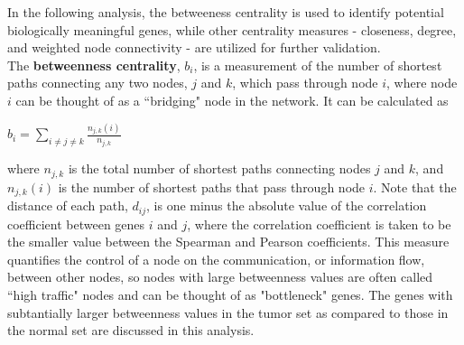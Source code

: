 \documentclass{article}\usepackage[]{graphicx}\usepackage[]{color}
\begin{document}
In the following analysis, the betweeness centrality is used to identify potential biologically meaningful genes, while other centrality measures - closeness, degree, and weighted node connectivity - are utilized for further validation.\\
\newline
The \textbf{betweenness centrality}, $b_i$, is a measurement of the number of shortest paths connecting any two nodes, $j$ and $k$, which pass through node $i$, where node $i$ can be thought of as a ``bridging" node in the network. It can be calculated as
\begin{center}
$b_i = \sum_{i \neq j \neq k} \frac{n_{j,k}(i)}{n_{j,k}}$
\end{center}
where $n_{j,k}$ is the total number of shortest paths connecting nodes $j$ and $k$, and $n_{j,k}(i)$ is the number of shortest paths that pass through node $i$. Note that the distance of each path, $d_{ij}$, is one minus the absolute value of the correlation coefficient between genes $i$ and $j$, where the correlation coefficient is taken to be the smaller value between the Spearman and Pearson coefficients. This measure quantifies the control of a node on the communication, or information flow, between other nodes, so nodes with large betweenness values are often called ``high traffic" nodes and can be thought of as "bottleneck" genes. The genes with subtantially larger betweenness values in the tumor set as compared to those in the normal set are discussed in this analysis.\\
\end{document}
